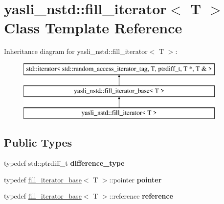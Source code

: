 \hypertarget{classyasli__nstd_1_1fill__iterator}{}\section{yasli\+\_\+nstd\+:\+:fill\+\_\+iterator$<$ T $>$ Class Template Reference}
\label{classyasli__nstd_1_1fill__iterator}
Inheritance diagram for yasli\+\_\+nstd\+:\+:fill\+\_\+iterator$<$ T $>$\+:\begin{figure}[H]
\begin{center}
\leavevmode
\includegraphics[height=3.000000cm]{classyasli__nstd_1_1fill__iterator}
\end{center}
\end{figure}
\subsection*{Public Types}
\begin{DoxyCompactItemize}
\item 
\hypertarget{classyasli__nstd_1_1fill__iterator_a65eb2b252da0551e558fc3ffd82be9fb}{}typedef std\+::ptrdiff\+\_\+t {\bfseries difference\+\_\+type}\label{classyasli__nstd_1_1fill__iterator_a65eb2b252da0551e558fc3ffd82be9fb}

\item 
\hypertarget{classyasli__nstd_1_1fill__iterator_a5d0f038545cb62961015e2e2cec9daaf}{}typedef \hyperlink{classyasli__nstd_1_1fill__iterator__base}{fill\+\_\+iterator\+\_\+base}$<$ T $>$\+::pointer {\bfseries pointer}\label{classyasli__nstd_1_1fill__iterator_a5d0f038545cb62961015e2e2cec9daaf}

\item 
\hypertarget{classyasli__nstd_1_1fill__iterator_ab961e0b2da0b12d7aad380e1b1d16d1a}{}typedef \hyperlink{classyasli__nstd_1_1fill__iterator__base}{fill\+\_\+iterator\+\_\+base}$<$ T $>$\+::reference {\bfseries reference}\label{classyasli__nstd_1_1fill__iterator_ab961e0b2da0b12d7aad380e1b1d16d1a}

\end{DoxyCompactItemize}
